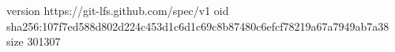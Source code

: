 version https://git-lfs.github.com/spec/v1
oid sha256:107f7ed588d802d224c453d1c6d1c69c8b87480c6efcf78219a67a7949ab7a38
size 301307
